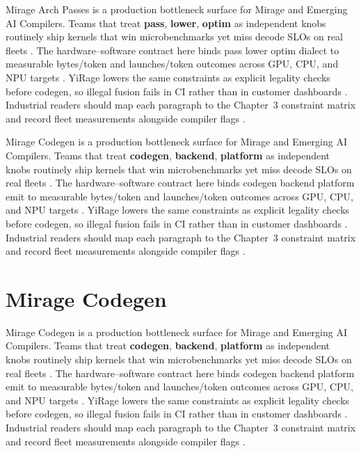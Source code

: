 Mirage Arch Passes is a production bottleneck surface for Mirage and Emerging AI Compilers. Teams that treat \textbf{pass}, \textbf{lower}, \textbf{optim} as independent knobs routinely ship kernels that win microbenchmarks yet miss decode SLOs on real fleets \citep{patel2025llminference,nvidia2022hopper}. The hardware--software contract here binds pass lower optim dialect to measurable bytes/token and launches/token outcomes across GPU, CPU, and NPU targets \citep{taxbreak2026,semianalysis2024tma}. YiRage lowers the same constraints as explicit legality checks before codegen, so illegal fusion fails in CI rather than in customer dashboards \citep{memoryfloor2026,amd2024xdna}. Industrial readers should map each paragraph to the Chapter~3 constraint matrix and record fleet measurements alongside compiler flags \citep{nvidia2022hopper,amd2024aie}.

Mirage Codegen is a production bottleneck surface for Mirage and Emerging AI Compilers. Teams that treat \textbf{codegen}, \textbf{backend}, \textbf{platform} as independent knobs routinely ship kernels that win microbenchmarks yet miss decode SLOs on real fleets \citep{taxbreak2026,semianalysis2024tma}. The hardware--software contract here binds codegen backend platform emit to measurable bytes/token and launches/token outcomes across GPU, CPU, and NPU targets \citep{memoryfloor2026,amd2024xdna}. YiRage lowers the same constraints as explicit legality checks before codegen, so illegal fusion fails in CI rather than in customer dashboards \citep{nvidia2022hopper,amd2024aie}. Industrial readers should map each paragraph to the Chapter~3 constraint matrix and record fleet measurements alongside compiler flags \citep{semianalysis2024tma,dlbook}.

\section{Mirage Codegen}
\label{sec:mirage_codegen}

Mirage Codegen is a production bottleneck surface for Mirage and Emerging AI Compilers. Teams that treat \textbf{codegen}, \textbf{backend}, \textbf{platform} as independent knobs routinely ship kernels that win microbenchmarks yet miss decode SLOs on real fleets \citep{memoryfloor2026,amd2024xdna}. The hardware--software contract here binds codegen backend platform emit to measurable bytes/token and launches/token outcomes across GPU, CPU, and NPU targets \citep{nvidia2022hopper,amd2024aie}. YiRage lowers the same constraints as explicit legality checks before codegen, so illegal fusion fails in CI rather than in customer dashboards \citep{semianalysis2024tma,dlbook}. Industrial readers should map each paragraph to the Chapter~3 constraint matrix and record fleet measurements alongside compiler flags \citep{amd2024xdna,dao2022flashattention}.

